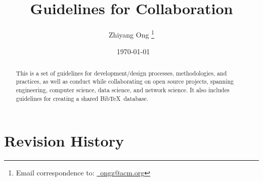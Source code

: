 \documentclass[letter,12pt]{article}
\begin{document}
\title{Guidelines for Collaboration}
\date{\textcopyleft\ \today}
\author{Zhiyang Ong \thanks{Email correspondence to: \href{mailto:ongz@acm.org}{\Email\ ongz@acm.org}}}
\maketitle


\begin{abstract} 
This is a set of guidelines for development/design processes, methodologies, and practices, as well as conduct while collaborating on open source projects, spanning engineering, computer science, data science, and network science. It also includes guidelines for creating a shared {\sc Bib}\TeX\ database.
\end{abstract}


\tableofcontents
\setcounter{secnumdepth}{4}



\section*{Revision History}
\label{sec:RevisionHistory}
\end{document}
